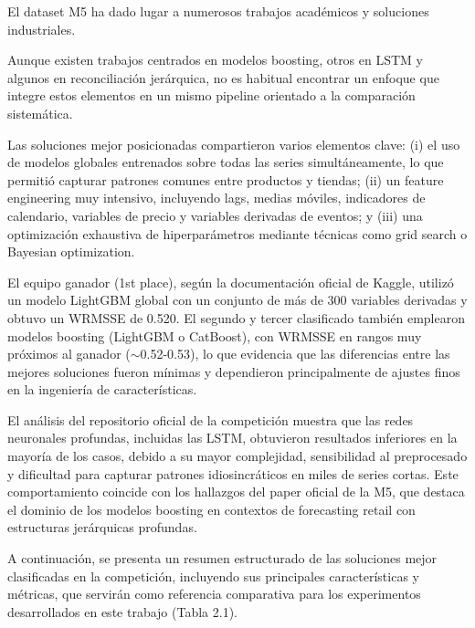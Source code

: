 \documentclass[IB,BIB]{TFUOC}%
\begin{document}
El dataset M5 ha dado lugar a numerosos trabajos académicos y soluciones
industriales.

Aunque existen trabajos centrados en modelos boosting, otros en LSTM y
algunos en reconciliación jerárquica, no es habitual encontrar un
enfoque que integre estos elementos en un mismo pipeline orientado a la
comparación sistemática.

Las soluciones mejor posicionadas compartieron varios
elementos clave: (i) el uso de modelos globales entrenados sobre todas
las series simultáneamente, lo que permitió capturar patrones comunes
entre productos y tiendas; (ii) un feature engineering muy intensivo,
incluyendo lags, medias móviles, indicadores de calendario, variables de
precio y variables derivadas de eventos; y (iii) una optimización
exhaustiva de hiperparámetros mediante técnicas como grid search o
Bayesian optimization.

El equipo ganador (1st place), según la documentación oficial de Kaggle, utilizó un modelo LightGBM global con un conjunto de más de 300 variables derivadas y obtuvo un WRMSSE de 0.520. El segundo y tercer clasificado también emplearon modelos boosting (LightGBM o CatBoost), con WRMSSE en rangos muy próximos al ganador ($\sim$0.52-0.53), lo que evidencia que las diferencias entre las mejores soluciones fueron mínimas y dependieron principalmente de ajustes finos en la ingeniería de características.

El análisis del repositorio oficial de la competición
muestra que las redes neuronales profundas, incluidas las LSTM,
obtuvieron resultados inferiores en la mayoría de los casos, debido a su
mayor complejidad, sensibilidad al preprocesado y dificultad para
capturar patrones idiosincráticos en miles de series cortas. Este
comportamiento coincide con los hallazgos del paper oficial de la M5,
que destaca el dominio de los modelos boosting en contextos de
forecasting retail con estructuras jerárquicas profundas.

A continuación, se presenta un resumen estructurado de las
soluciones mejor clasificadas en la competición, incluyendo sus
principales características y métricas, que servirán como referencia
comparativa para los experimentos desarrollados en este trabajo (Tabla 2.1).
\end{document}
